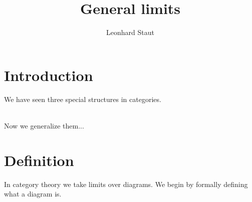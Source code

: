 \def\pathToRoot{../../}

\title{General limits}
\author{Leonhard Staut}



\maketitle
\chapter{Introduction}
We have seen three special structures in categories.\\[1em]
\begin{minipage}{.35\linewidth}
\end{minipage}%
\begin{minipage}{.35\linewidth}
\end{minipage}%
\begin{minipage}{.3\linewidth}
\end{minipage}\\[2em]
Now we generalize them...
\chapter{Definition}

In category theory we take limits over diagrams.
We begin by formally defining what a diagram is.

